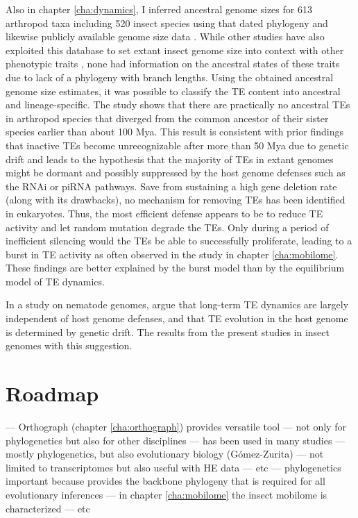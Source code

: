 Also in chapter \ref{cha:dynamics}, I inferred ancestral genome sizes
for 613 arthropod taxa including 520 insect species using that dated
phylogeny and likewise publicly available genome size data
\citep{Gregory2018}. While other studies have also exploited this
database to set extant insect genome size into context with other
phenotypic traits \citep{Alfsnes2017, Gregory2011}, none had information
on the ancestral states of these traits due to lack of a phylogeny with
branch lengths. Using the obtained ancestral genome size estimates, it
was possible to classify the TE content into ancestral and
lineage-specific. The study shows that there are practically no
ancestral TEs in arthropod species that diverged from the common
ancestor of their sister species earlier than about 100 Mya. This result
is consistent with prior findings that inactive TEs become
unrecognizable after more than 50 Mya due to genetic drift
\citep{Shedlock2000} and leads to the hypothesis that the majority of
TEs in extant genomes might be dormant and possibly suppressed by the
host genome defenses such as the RNAi or piRNA pathways. Save from
sustaining a high gene deletion rate (along with its drawbacks), no
mechanism for removing TEs has been identified in eukaryotes. Thus, the
most efficient defense appears to be to reduce TE activity and let
random mutation degrade the TEs.  Only during a period of inefficient
silencing would the TEs be able to successfully proliferate, leading to
a burst in TE activity as often observed in the study in chapter
\ref{cha:mobilome}. These findings are better explained by the burst
model than by the equilibrium model of TE dynamics.

In a study on nematode genomes, \citet{Szitenberg2016} argue that
long-term TE dynamics are largely independent of host genome defenses,
and that TE evolution in the host genome is determined by genetic drift.
The results from the present studies in insect genomes  with this
suggestion. 

\section{Roadmap}

 --- Orthograph (chapter \ref{cha:orthograph})
provides versatile tool --- not only for phylogenetics but also for
other disciplines --- has been used in many studies --- mostly
phylogenetics, but also evolutionary biology (Gómez-Zurita) --- not
limited to transcriptomes but also useful with HE data --- etc ---
phylogenetics important because provides the backbone phylogeny that is
required for all evolutionary inferences --- in chapter
\ref{cha:mobilome} the insect mobilome is characterized --- etc

